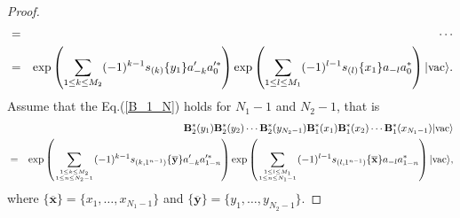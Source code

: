 \documentclass[10pt,a4paper]{amsart}
\numberwithin{equation}{section}
\begin{document}
\begin{proof}
\begin{eqnarray}
&=&\cdots\notag\\
&=&\exp\left(\sum\limits_{1\leq k\leq M_{2}}(-1)^{k-1}s_{(k)}\{y_{1}\}a^{\prime}_{-k}a^{\prime\ast}_{0}\right)
\exp\left(\sum\limits_{1\leq l\leq M_{1}}(-1)^{l-1}s_{(l)}\{x_{1}\}a_{-l}a^{\ast}_{0}\right)|\text{vac}\rangle.
\end{eqnarray}
Assume that the Eq.(\ref{B_1_N}) holds for $N_{1}-1$ and $N_{2}-1$, that is
\begin{eqnarray}
&&\mathbf{B}^{\ast}_{2}(y_{1})\mathbf{B}^{\ast}_{2}(y_{2})\cdots
\mathbf{B}^{\ast}_{2}(y_{N_{2}-1})\mathbf{B}^{\ast}_{1}(x_{1})
\mathbf{B}^{\ast}_{1}(x_{2})\cdots\mathbf{B}^{\ast}_{1}(x_{N_{1}-1})|\text{vac}\rangle\notag\\
&=&\exp\left(\sum\limits_{1\leq k\leq M_{2}\atop{1\leq n\leq N_{2}-1}}(-1)^{k-1}s_{(k,1^{n-1})}\{\mathbf{\overline{y}}\}a^{\prime}_{-k}
a^{\prime\ast}_{1-n}\right)
\exp\left(\sum\limits_{1\leq l\leq M_{1}\atop{1\leq n\leq N_{1}-1}}(-1)^{l-1}s_{(l,1^{n-1})}\{\mathbf{\overline{x}}\}a_{-l}a^{\ast}_{1-n}\right)|\text{vac}\rangle,
\notag\\
\end{eqnarray}
where $\{\mathbf{\overline{x}}\}=\{x_1,\ldots,x_{N_{1}-1}\}$ and $\{\mathbf{\overline{y}}\}=\{y_1,\ldots,y_{N_{2}-1}\}$.


\end{proof}
\end{document}
